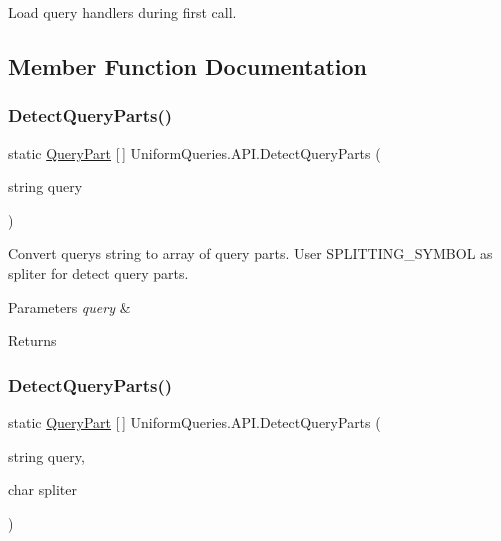 Load query handlers during first call. 



\subsection{Member Function Documentation}
\mbox{\label{class_uniform_queries_1_1_a_p_i_a013ca0eff0e67d7f30a6be289312b859}} 
\subsubsection{\texorpdfstring{Detect\+Query\+Parts()}{DetectQueryParts()}\hspace{0.1cm}{\footnotesize\ttfamily [1/2]}}
{\footnotesize\ttfamily static \mbox{\hyperlink{struct_uniform_queries_1_1_query_part}{Query\+Part}} \mbox{[}$\,$\mbox{]} Uniform\+Queries.\+A\+P\+I.\+Detect\+Query\+Parts (\begin{DoxyParamCaption}\item[{string}]{query }\end{DoxyParamCaption})\hspace{0.3cm}{\ttfamily [static]}}



Convert query\textquotesingle{}s string to array of query parts. User S\+P\+L\+I\+T\+T\+I\+N\+G\+\_\+\+S\+Y\+M\+B\+OL as spliter for detect query parts. 


\begin{DoxyParams}{Parameters}
{\em query} & \\
\hline
\end{DoxyParams}
\begin{DoxyReturn}{Returns}

\end{DoxyReturn}
\mbox{\label{class_uniform_queries_1_1_a_p_i_ab5875a3346878ba21ab331ba07889e92}} 
\subsubsection{\texorpdfstring{Detect\+Query\+Parts()}{DetectQueryParts()}\hspace{0.1cm}{\footnotesize\ttfamily [2/2]}}
{\footnotesize\ttfamily static \mbox{\hyperlink{struct_uniform_queries_1_1_query_part}{Query\+Part}} \mbox{[}$\,$\mbox{]} Uniform\+Queries.\+A\+P\+I.\+Detect\+Query\+Parts (\begin{DoxyParamCaption}\item[{string}]{query,  }\item[{char}]{spliter }\end{DoxyParamCaption})\hspace{0.3cm}{\ttfamily [static]}}




